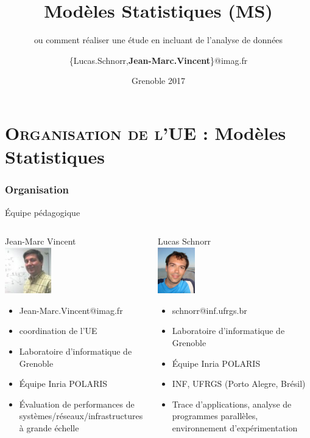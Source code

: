 \documentclass[xcolor=x11names,compress,8pt]{beamer}
\title[] %
{Modèles Statistiques (MS)}
\subtitle{ou comment réaliser une étude en incluant de l'analyse de données}
\author%
{		
\{Lucas.Schnorr,\textbf{Jean-Marc.Vincent}\}@imag.fr\inst{1} 
}
\institute[Université  Grenoble-Alpes] %
{%
 Laboratoire LIG\\
  Équipe-Projet Inria POLARIS
}
\date[Grenoble 2017] %
{
Grenoble 2017
}
\renewcommand{\(}{\begin{columns}}
\renewcommand{\)}{\end{columns}}
\newcommand{\<}[1]{\begin{column}{#1}}
\renewcommand{\>}{\end{column}}
\begin{document}
\begin{frame}
\titlepage
\end{frame}
\section[{\scshape Organisation}]{{\scshape Organisation de l'UE} : Modèles Statistiques }
\begin{frame}
\frametitle{Organisation}	
\begin{block}{Équipe pédagogique}
\begin{columns}[t]
\begin{center}
Jean-Marc Vincent \\
 \includegraphics[height=2cm]{images/Jean-Marc.jpg}
\begin{itemize}
\item[]  Jean-Marc.Vincent@imag.fr
\item[]  coordination de l'UE
 \item[]  Laboratoire d'informatique de Grenoble 
\item[] Équipe Inria POLARIS
\item[]   Évaluation de performances de systèmes/réseaux/infrastructures à grande échelle
\end{itemize}
\end{center}
\begin{center}
Lucas Schnorr\\
 \includegraphics[height=2cm]{images/lucas-schnorr.png}
\begin{itemize}
\item[]   schnorr@inf.ufrgs.br
\item[] Laboratoire d'informatique de Grenoble  
\item[] Équipe Inria POLARIS
\item[] INF, UFRGS (Porto Alegre, Brésil)
\item[] Trace d'applications, analyse de programmes parallèles, environnement d'expérimentation
\end{itemize}
\end{center}
\end{columns}
\end{block}
\end{frame}
\end{document}
